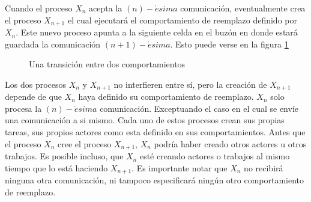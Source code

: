 
Cuando el proceso $X_n$ acepta la $(n)-\acute{e}sima$ comunicación, eventualmente crea el proceso $X_{n+1}$ el cual ejecutará el comportamiento de reemplazo definido por $X_n$. Este nuevo proceso apunta a la siguiente celda en el buzón en donde estará guardada la comunicación $(n+1)-\acute{e}sima$. Esto puede verse en la figura \ref{fig:actortransition}

\begin{figure}[H]
\caption{Una transición entre dos comportamientos}
\label{fig:actortransition}
\end{figure}
Los dos procesos $X_n$ y $X_{n+1}$ no interfieren entre sí, pero la creación de $X_{n+1}$ depende de que $X_{n}$ haya definido su comportamiento de reemplazo. $X_n$ solo procesa la $(n)-\acute{e}sima$ comunicación. Exceptuando el caso en el cual se envíe una comunicación a si mismo. Cada uno de estos procesos crean sus propias tareas, sus propios actores como esta definido en sus comportamientos. Antes que el proceso $X_n$ cree el proceso $X_{n+1}$, $X_n$ podría haber creado otros actores u otros trabajos. Es posible incluso, que $X_n$ esté creando actores o trabajos al mismo tiempo que lo está haciendo $X_{n+1}$. Es importante notar que $X_n$ no recibirá ninguna otra comunicación, ni tampoco especificará ningún otro comportamiento de reemplazo.
